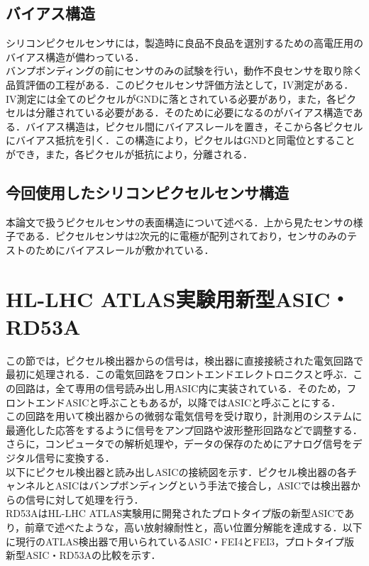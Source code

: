 \subsection{バイアス構造}
シリコンピクセルセンサには，製造時に良品不良品を選別するための高電圧用のバイアス構造が備わっている．\\
バンプボンディングの前にセンサのみの試験を行い，動作不良センサを取り除く品質評価の工程がある．このピクセルセンサ評価方法として，IV測定がある．IV測定には全てのピクセルがGNDに落とされている必要があり，また，各ピクセルは分離されている必要がある．そのために必要になるのがバイアス構造である．バイアス構造は，ピクセル間にバイアスレールを置き，そこから各ピクセルにバイアス抵抗を引く．この構造により，ピクセルはGNDと同電位とすることができ，また，各ピクセルが抵抗により，分離される．

\subsection{今回使用したシリコンピクセルセンサ構造}
本論文で扱うピクセルセンサの表面構造について述べる．上から見たセンサの様子である．ピクセルセンサは2次元的に電極が配列されており，センサのみのテストのためにバイアスレールが敷かれている．

\section{HL-LHC ATLAS実験用新型ASIC・RD53A}
この節では，ピクセル検出器からの信号は，検出器に直接接続された電気回路で最初に処理される．この電気回路をフロントエンドエレクトロニクスと呼ぶ．この回路は，全て専用の信号読み出し用ASIC内に実装されている．そのため，フロントエンドASICと呼ぶこともあるが，以降ではASICと呼ぶことにする．\\
この回路を用いて検出器からの微弱な電気信号を受け取り，計測用のシステムに最適化した応答をするように信号をアンプ回路や波形整形回路などで調整する．さらに，コンピュータでの解析処理や，データの保存のためにアナログ信号をデジタル信号に変換する．\\
以下にピクセル検出器と読み出しASICの接続図を示す．ピクセル検出器の各チャンネルとASICはバンプボンディングという手法で接合し，ASICでは検出器からの信号に対して処理を行う．\\


RD53AはHL-LHC ATLAS実験用に開発されたプロトタイプ版の新型ASICであり，前章で述べたような，高い放射線耐性と，高い位置分解能を達成する．以下に現行のATLAS検出器で用いられているASIC・FEI4とFEI3，プロトタイプ版新型ASIC・RD53Aの比較を示す．

